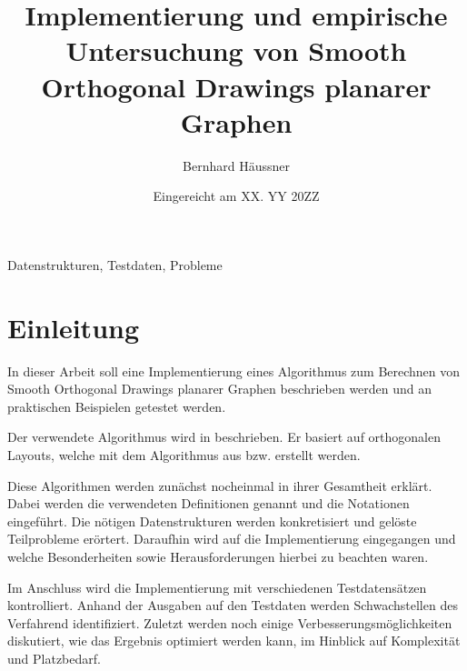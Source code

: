 \documentclass[a4paper]{scrreprt}
\theoremstyle{definition}
\begin{document}


\subject{Bachelorarbeit}
\title{Implementierung und empirische Untersuchung von Smooth Orthogonal Drawings planarer Graphen} %
\author{Bernhard Häussner} %
\date{Eingereicht am XX. YY 20ZZ} %
\titlehead{Julius-Maximilians-Universität Würzburg\\
Institut für Informatik\\
Lehrstuhl für Informatik I\\
Effiziente Algorithmen und wissensbasierte Systeme}
\publishers{Betreuer:\\
Prof.\ Dr.\ Alexander Wolff\\
Dipl.-Inf.\ Philipp Kindermann} %
\maketitle
\tableofcontents




Datenstrukturen, Testdaten, Probleme

\chapter{Einleitung}

In dieser Arbeit soll eine Implementierung eines Algorithmus 
zum Berechnen von Smooth Orthogonal Drawings planarer Graphen beschrieben werden und
an praktischen Beispielen getestet werden.

Der verwendete Algorithmus wird in \cite{smooth-13} beschrieben. Er basiert auf orthogonalen
Layouts, welche mit dem Algorithmus aus \cite{biedl+kant-98} bzw. \cite{liu+etal-98} erstellt
werden.

Diese Algorithmen werden zunächst nocheinmal in ihrer Gesamtheit erklärt. Dabei werden die
verwendeten Definitionen genannt und die Notationen eingeführt. Die nötigen Datenstrukturen
werden konkretisiert und gelöste Teilprobleme erörtert. Daraufhin wird auf die Implementierung eingegangen und welche Besonderheiten sowie Herausforderungen hierbei zu
beachten waren. 

Im Anschluss wird die Implementierung mit verschiedenen Testdatensätzen kontrolliert. Anhand
der Ausgaben auf den Testdaten werden Schwachstellen des Verfahrend identifiziert. 
Zuletzt werden noch einige Verbesserungsmöglichkeiten diskutiert, wie das Ergebnis
optimiert werden kann, im Hinblick auf Komplexität und Platzbedarf.
\end{document}
